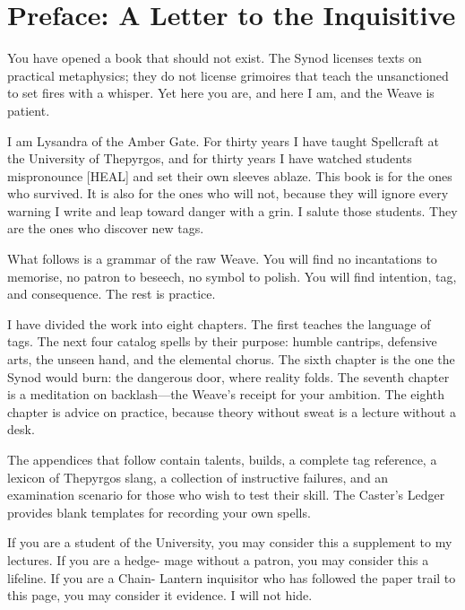 \documentclass[11pt]{book}
\begin{document}


\frontmatter


\tableofcontents

\chapter*{Preface: A Letter to the Inquisitive}

You have opened a book that should not exist. The Synod licenses texts on practical metaphysics; they do not license grimoires that teach the unsanctioned to set fires with a whisper. Yet here you are, and here I am, and the Weave is patient.

I am Lysandra of the Amber Gate. For thirty years I have taught Spellcraft at the University of Thepyrgos, and for thirty years I have watched students mispronounce [HEAL] and set their own sleeves ablaze. This book is for the ones who survived. It is also for the ones who will not, because they will ignore every warning I write and leap toward danger with a grin. I salute those students. They are the ones who discover new tags.

What follows is a grammar of the raw Weave. You will find no incantations to memorise, no patron to beseech, no symbol to polish. You will find intention, tag, and consequence. The rest is practice.

I have divided the work into eight chapters. The first teaches the language of tags. The next four catalog spells by their purpose: humble cantrips, defensive arts, the unseen hand, and the elemental chorus. The sixth chapter is the one the Synod would burn: the dangerous door, where reality folds. The seventh chapter is a meditation on backlash---the Weave's receipt for your ambition. The eighth chapter is advice on practice, because theory without sweat is a lecture without a desk.

The appendices that follow contain talents, builds, a complete tag reference, a lexicon of Thepyrgos slang, a collection of instructive failures, and an examination scenario for those who wish to test their skill. The Caster's Ledger provides blank templates for recording your own spells.

If you are a student of the University, you may consider this a supplement to my lectures. If you are a hedge- mage without a patron, you may consider this a lifeline. If you are a Chain- Lantern inquisitor who has followed the paper trail to this page, you may consider it evidence. I will not hide.
\end{document}

